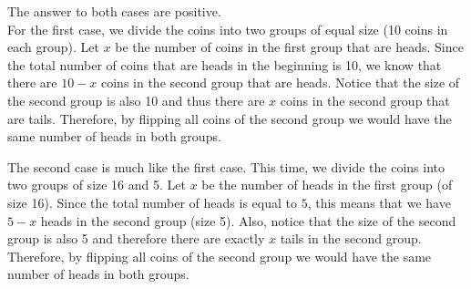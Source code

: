 \begin{solution}
The answer to both cases are positive.\\[0.2cm]

For the first case, we divide the coins into two groups of equal size (10 coins in each group). Let $x$ be the number of coins in the first group that are heads. Since the total number of coins that are heads in the beginning is 10, we know that there are $10-x$ coins in the second group that are heads. Notice that the size of the second group is also 10 and thus there are $x$ coins in the second group that are tails. Therefore, by flipping all coins of the second group we would have the same number of heads in both groups.

The second case is much like the first case. This time, we divide the coins into two groups of size 16 and 5. Let $x$ be the number of heads in the first group (of size 16). Since the total number of heads is equal to $5$, this means that we have $5-x$ heads in the second group (size 5). Also, notice that the size of the second group is also 5 and therefore there are exactly $x$ tails in the second group. Therefore, by flipping all coins of the second group we would have the same number of heads in both groups.
\end{solution}
